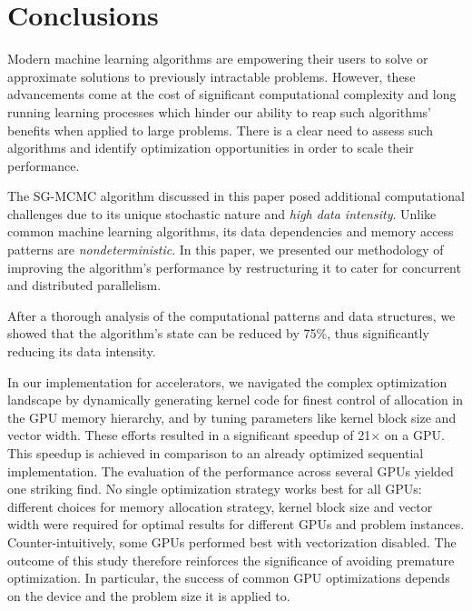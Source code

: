 \section{Conclusions}
\label{sec-conclusion}

Modern machine learning algorithms are empowering their
users to solve or approximate solutions to previously intractable problems.
However, these advancements come at the cost of significant computational
complexity and long running learning processes which hinder our ability to reap
such algorithms' benefits when applied to large problems. There is a clear need
to assess such algorithms and identify optimization opportunities in order to
scale their performance.

The SG-MCMC algorithm discussed in this paper posed additional computational
challenges due to its unique stochastic nature and \emph{high data intensity}. Unlike
common machine learning algorithms, its data dependencies and memory access
patterns are \emph{nondeterministic}. In this paper, we presented our methodology of
improving the algorithm's performance by restructuring it to
cater for concurrent and distributed parallelism.

After a thorough
analysis of the computational patterns and data structures,
we showed that the algorithm's state can be reduced by 75\%,
thus significantly
reducing its data intensity.

In our implementation for accelerators, we navigated the complex optimization
landscape by dynamically generating kernel code for finest control of allocation in
the GPU memory hierarchy, and by tuning parameters like kernel block size and vector
width. These efforts resulted in
a significant speedup of 21$\times$ on a GPU.
This speedup is achieved in comparison to an already
optimized sequential implementation. The evaluation of the performance
across several GPUs yielded one striking find. No single optimization strategy
works best for all GPUs: different choices for memory allocation strategy,
kernel block size and vector width were required for optimal results for
different GPUs and problem instances. Counter-intuitively, some GPUs performed
best with vectorization disabled.
%
The outcome of this study therefore reinforces the significance of avoiding premature
optimization. In particular, the success
of common GPU optimizations depends on the device and the
problem size it is applied to.

